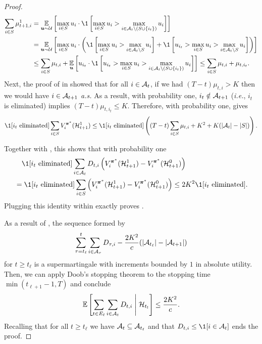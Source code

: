\begin{proof}
\begin{align*}
    \sum_{i\in S}\mu_{t+1,i}^1 
    &= \E_{\bm u\sim \mV}\sqb{\max_{i\in S}u_i \cdot \1\sqb{\max_{i\in S}u_i> \max_{i\in \mA_t\setminus(S\cup\{i_t\})}u_i}}\\
    &= \E_{\bm u\sim \mV}\sqb{\max_{i\in S}u_i \cdot \paren{ \1\sqb{\max_{i\in S}u_i> \max_{i\in \mA_t\setminus S}u_i} + \1\sqb{u_{i_t}>\max_{i\in S}u_i> \max_{i\in \mA_t\setminus S}u_i }}} \\
    &\leq \sum_{i\in S}\mu_{t,i} + \E_{\bm u}\sqb{u_{i_t} \cdot \1\sqb{u_{i_t}>\max_{i\in S}u_i> \max_{i\in \mA_t\setminus (S\cup\{i_t\})}u_i }} \leq \sum_{i\in S}\mu_{t,i} + \mu_{t,i_t}.
\end{align*} 
Next, the proof of  in  showed that for all $i\in\mathcal{A}_t$, if we had $(T-t)\mu_{t,i}>K$ then we would have $i\in\mathcal{A}_{t+1}$ \textit{a.s.} As a result, with probability one, $i_t\notin\mathcal{A}_{t+1}$ (\textit{i.e.}, $i_t$ is eliminated) implies $(T-t)\mu_{t,i_t}\leq K$. Therefore, with probability one,  gives
\begin{equation*}
    \1[i_t\text{ eliminated}] \sum_{i\in S}  V_i^{{\bm \pi}^{\ast}}(\mH_{t+1}^1) \leq \1[i_t\text{ eliminated}]\paren{ (T-t)\sum_{i\in S}\mu_{t,i} + K^2 + K(|\mA_t|-|S|)}.
\end{equation*}

Together with , this shows that with probability one
\begin{align*}
    &\quad \1[i_t\text{ eliminated}]\sum_{i\in \mA_t} D_{t,i}\paren{  V_i^{{\bm \pi}^{\ast}}(\mH_{t+1}^1) - V_i^{{\bm \pi}^{\ast}}(\mH_{t+1}^0)} \\
    &=\1[i_t\text{ eliminated}]\sum_{i\in S} \left (V_i^{{\bm \pi}^{\ast}}(\mH_{t+1}^1) -  V_i^{{\bm \pi}^{\ast}}(\mH_{t+1}^0)\right )\leq 2K^2 \1[i_t\text{ eliminated}].
\end{align*}
Plugging this identity within  exactly proves .

As a result of , the sequence formed by
\begin{equation*}
    \sum_{\tau=t_\ell}^{t} \sum_{i\in\mathcal{A}_{\tau}}D_{\tau,i} - \frac{2K^2}{c} (|\mathcal{A}_{t_\ell}| - |\mathcal{A}_{t+1}|)
\end{equation*}
for $t\geq t_\ell$ is a supermartingale with increments bounded by $1$ in absolute utility. Then, we can apply Doob's stopping theorem to the stopping time $\min(t_{\ell+1}-1,T)$ and conclude
\begin{equation*}
    \E\sqb{\sum_{t\in E_\ell} \sum_{i\in\mA_t}D_{t,i} \middle \vert \mH_{t_l}} \leq \frac{2K^2}{c}.
\end{equation*}
Recalling that for all $t\geq t_\ell$ we have $\mathcal{A}_t\subseteq\mathcal{A}_{t_\ell}$ and that $D_{t,i}\leq \1[i\in\mA_t]$ ends the proof.
\end{proof}

